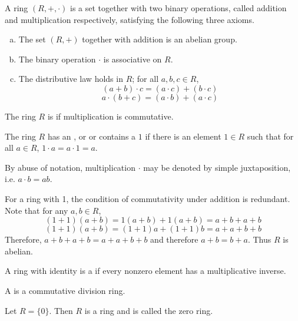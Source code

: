 \documentclass[11pt,letterpaper]{jacky}
\begin{document}
\begin{bdefi}
    A ring $(R,+,\cdot)$ is a set together with two binary operations, called addition and multiplication respectively, satisfying the following three axioms.
    \begin{enumerate}[(a)]
        \item The set $(R,+)$ together with addition is an abelian group.
        \item The binary operation $\cdot$ is associative on $R$.
        \item The distributive law holds in $R$; for all $a,b,c\in R$,
            $$(a+b)\cdot c=(a\cdot c)+(b\cdot c)$$
            $$a\cdot(b+c)=(a\cdot b)+(a\cdot c)$$
    \end{enumerate}
\end{bdefi}

\begin{defi}
    The ring $R$ is  if multiplication is commutative.
\end{defi}

\begin{defi}
    The ring $R$ has an , or  or contains a $1$ if there is an element $1\in R$ such that for all $a\in R$, $1\cdot a=a\cdot1=a$.
\end{defi}

\begin{note}
    By abuse of notation, multiplication $\cdot$ may be denoted by simple juxtaposition, i.e. $a\cdot b=ab$.
\end{note}

\begin{note}
    For a ring with 1, the condition of commutativity under addition is redundant. Note that for any $a,b\in R$,
    $$(1+1)(a+b)=1(a+b)+1(a+b)=a+b+a+b$$
    $$(1+1)(a+b)=(1+1)a+(1+1)b=a+a+b+b$$
    Therefore, $a+b+a+b=a+a+b+b$ and therefore $a+b=b+a$. Thus $R$ is abelian.
\end{note}

\begin{defi}
    A ring with identity is a  if every nonzero element has a multiplicative inverse.
\end{defi}

\begin{defi}
    A  is a commutative division ring.
\end{defi}

\begin{ex}
    Let $R=\{0\}$. Then $R$ is a ring and is called the zero ring.
\end{ex}
\end{document}
